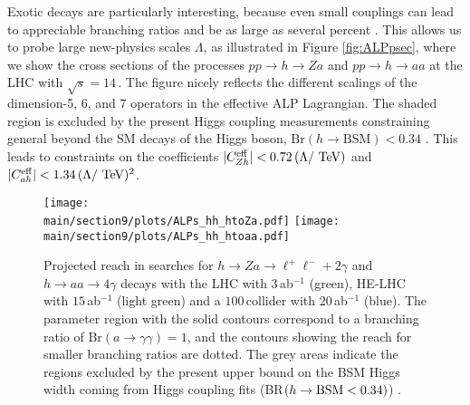 Exotic decays are particularly interesting, because even small couplings can lead to appreciable branching ratios and be as large as several percent \cite{Bauer:2017nlg, Bauer:2017ris}. 
This allows us to probe large new-physics scales $\Lambda$, as illustrated in Figure \ref{fig:ALPpsec}, where we show the cross sections of the processes $pp \to h \to Z a$ and $pp \to h \to aa$  at the LHC with $\sqrt{s} = 14\,$\UTeV. The figure nicely reflects the different scalings of the dimension-5, 6, and 7 operators in the effective ALP Lagrangian. The 
shaded region is excluded by the present Higgs coupling measurements constraining general beyond the SM decays of the Higgs boson, $\text{Br}(h\to\text{BSM})<0.34$ 
\cite{Khachatryan:2016vau}. This leads to constraints on the coefficients $|C_{Zh}^{\textrm{eff}}| < 0.72\,(\Lambda/\textrm{\ensuremath{~\text{TeV}}})$ and $|C_{ah}^{\rm eff}| < 1.34\,(\Lambda/\textrm{\ensuremath{~\text{TeV}}})^2$. 


%
\begin{figure}[t]
\begin{center}
\texttt{[image: \\main/section9/plots/ALPs\_hh\_htoZa.pdf]}
\texttt{[image: \\main/section9/plots/ALPs\_hh\_htoaa.pdf]}
\end{center}
\vspace{-0mm}
\caption{\label{fig:pphZa} Projected reach in searches for $h \to Za \to \ell^+\ell^-+2\gamma $ and $h \to aa \to 4\gamma $ decays with the LHC with $3$\,ab$^{-1}$
(green), HE-LHC with $15$\,ab$^{-1}$ (light green) and a $100\,$\UTeV collider with $20$\,ab$^{-1}$ (blue). The parameter region with the solid contours correspond to a branching ratio of $\text{Br}(a\to 
\gamma\gamma)=1$, and the contours showing the reach for smaller branching ratios are dotted. The grey areas indicate the regions excluded by the present upper bound on the BSM Higgs width coming from Higgs coupling fits (BR$(h\to{\rm{BSM}}<0.34)$) \cite{Khachatryan:2016vau}.}
\end{figure}
%


